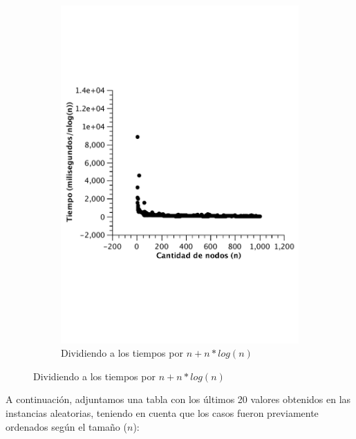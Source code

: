 \begin{figure}[H]
        \begin{subfigure}[b]{0.25\textwidth}
                \includegraphics[width=\textwidth]{imagenes/vacio-listas-4.pdf}
                \caption{Dividiendo a los tiempos por $n + n*log(n)$}
        \end{subfigure}

\end{figure}

A continuación, adjuntamos una tabla con los últimos 20 valores obtenidos en las instancias aleatorias, teniendo en cuenta que los casos fueron previamente ordenados según el tamaño ($n$):

